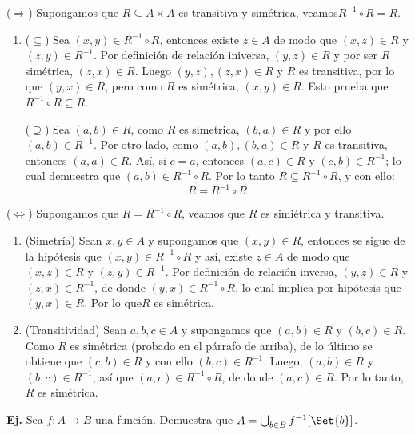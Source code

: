 \documentclass[letterpaper,DIV=14,headsepline,12pt]{scrartcl}
\makeatletter
\newcounter{Ejer}
\newcommand{\pts}{}
\newenvironment{ejercicio}[1]{\noindent
    \ifthenelse{\equal{#1}{1} \OR \equal{#1}{+1}}{\renewcommand{\pts}{\textbf{(#1 pt)}}}{\renewcommand{\pts}{\textbf{(#1 pts)}}}\textbf{Ej. \theEjer} \pts\stepcounter{Ejer}}{\vspace{.3cm}}
\renewenvironment{proof}[1][]{%
        \par\pushQED{\qed}%
        \normalfont\topsep6pt \partopsep0pt %
        \trivlist
        \item[\hskip\labelsep
                \textbf{\textit{Demostración.}}%
        ]#1
        }{%
        \popQED\endtrivlist\@endpefalse
    }
\makeatother
\begin{document}
    \begin{proof}
        ($\Rightarrow$) Supongamos que $R \subseteq A \times A$ es transitiva y simétrica, veamos$R^{-1}\circ R=R$.
        \begin{enumerate}[\hspace{.3cm}]
            \item ($\subseteq$) Sea $(x,y) \in R^{-1}\circ R$, entonces existe $z \in A$ de modo que $(x,z) \in R$ y $(z,y) \in R^{-1}$. Por definición de relación iniversa, $(y,z) \in R$ y por ser $R$ simétrica, $(z,x) \in R$. Luego $(y,z),(z,x) \in R$ y $R$ es transitiva, por lo que $(y,x) \in R$, pero como $R$ es simétrica, $(x,y) \in R$. Esto prueba que $R^{-1}\circ R \subseteq R$.
            
            ($\supseteq$) Sea $(a,b) \in R$, como $R$ es simetrica, $(b,a) \in R$ y por ello $(a,b) \in R^{-1}$. Por otro lado, como $(a,b),(b,a) \in R$ y $R$ es transitiva, entonces $(a,a) \in R$. Así, si $c=a$, entonces $(a,c) \in R$ y $(c,b) \in R^{-1}$; lo cual demuestra que $(a,b) \in R^{-1} \circ R$. Por lo tanto $R \subseteq R^{-1} \circ R$, y con ello:
            \[ R=R^{-1}\circ R \]
        \end{enumerate}

        ($\Leftrightarrow$) Supongamos que $R=R^{-1}\circ R$, veamos que $R$ es simiétrica y transitiva.
        \begin{enumerate}[\hspace{.3cm}]
            \item (Simetría) Sean $x,y \in A$ y supongamos que $(x,y) \in R$, entonces se sigue de la hipótesis que $(x,y) \in R^{-1}\circ R$ y así, existe $z \in A$ de modo que $(x,z) \in R$ y $(z,y) \in R^{-1}$. Por definición de relación inversa, $(y,z)\in R$ y $(z,x) \in R^{-1}$, de donde $(y,x) \in R^{-1} \circ R$, lo cual implica por hipótesis que $(y,x) \in R$. Por lo que$R$ es simétrica.
            
            \item (Transitividad) Sean $a,b,c \in A$ y supongamos que $(a,b) \in R$ y $(b,c) \in R$. Como $R$ es simétrica (probado en el párrafo de arriba), de lo último se obtiene que $(c,b) \in R$ y con ello $(b,c) \in R^{-1}$. Luego, $(a,b) \in R$ y $(b,c) \in R^{-1}$, así que $(a,c) \in R^{-1} \circ R$, de donde $(a,c) \in R$. Por lo tanto, $R$ es simétrica.
        \end{enumerate}
    \end{proof}


    \newpage
    \begin{ejercicio}{2.5}
        Sea \(f\colon A\to B\) una función. Demuestra que 
        \(A=\bigcup_{b\in B}f^{-1}[\Set{b}]\). 
    \end{ejercicio}
\end{document}
